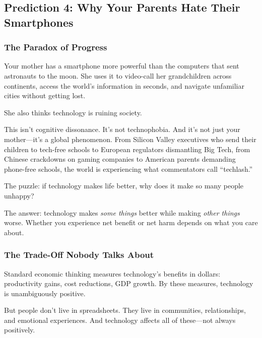 \subsection{Prediction 4: Why Your Parents Hate Their Smartphones}
\label{subsec:pred4-techlash}


\subsubsection{The Paradox of Progress}

Your mother has a smartphone more powerful than the computers that sent 
astronauts to the moon. She uses it to video-call her grandchildren across 
continents, access the world's information in seconds, and navigate unfamiliar 
cities without getting lost.

She also thinks technology is ruining society.

This isn't cognitive dissonance. It's not technophobia. And it's not just 
your mother---it's a global phenomenon. From Silicon Valley executives who 
send their children to tech-free schools to European regulators dismantling 
Big Tech, from Chinese crackdowns on gaming companies to American parents 
demanding phone-free schools, the world is experiencing what commentators 
call ``techlash.''

The puzzle: if technology makes life better, why does it make so many 
people unhappy?

The answer: technology makes \emph{some things} better while making 
\emph{other things} worse. Whether you experience net benefit or net harm 
depends on what you care about.

\subsubsection{The Trade-Off Nobody Talks About}

Standard economic thinking measures technology's benefits in dollars: 
productivity gains, cost reductions, GDP growth. By these measures, 
technology is unambiguously positive.

But people don't live in spreadsheets. They live in communities, 
relationships, and emotional experiences. And technology affects 
all of these---not always positively.

